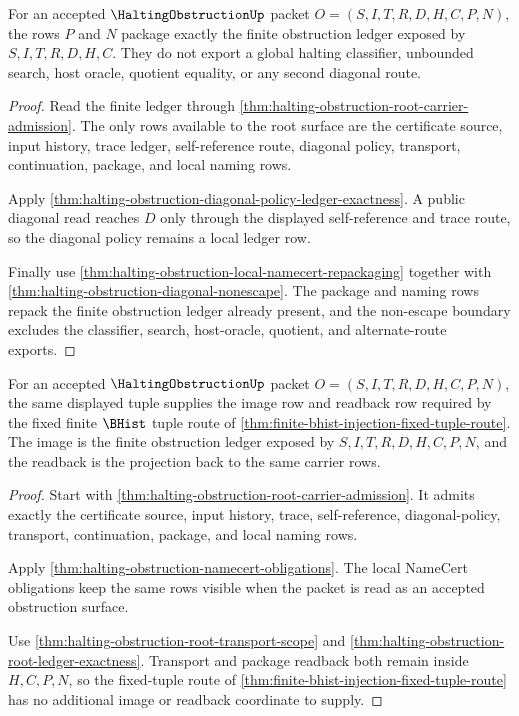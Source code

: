 \begin{theorem}
\label{thm:halting-obstruction-root-ledger-exactness}
For an accepted $\HaltingObstructionUp$ packet $O=(S,I,T,R,D,H,C,P,N)$, the
rows $P$ and $N$ package exactly the finite obstruction ledger exposed by
$S,I,T,R,D,H,C$. They do not export a global halting classifier, unbounded
search, host oracle, quotient equality, or any second diagonal route.
\end{theorem}
\begin{proof}
Read the finite ledger through
\autoref{thm:halting-obstruction-root-carrier-admission}. The only rows
available to the root surface are the certificate source, input history, trace
ledger, self-reference route, diagonal policy, transport, continuation,
package, and local naming rows.

Apply \autoref{thm:halting-obstruction-diagonal-policy-ledger-exactness}. A
public diagonal read reaches $D$ only through the displayed self-reference and
trace route, so the diagonal policy remains a local ledger row.

Finally use \autoref{thm:halting-obstruction-local-namecert-repackaging}
together with \autoref{thm:halting-obstruction-diagonal-nonescape}. The
package and naming rows repack the finite obstruction ledger already present,
and the non-escape boundary excludes the classifier, search, host-oracle,
quotient, and alternate-route exports.
\end{proof}

\begin{theorem}
\label{thm:halting-obstruction-stdbridge-image-readback}
For an accepted $\HaltingObstructionUp$ packet $O=(S,I,T,R,D,H,C,P,N)$, the
same displayed tuple supplies the image row and readback row required by the
fixed finite $\BHist$ tuple route of
\autoref{thm:finite-bhist-injection-fixed-tuple-route}. The image is the
finite obstruction ledger exposed by $S,I,T,R,D,H,C,P,N$, and the readback is
the projection back to the same carrier rows.
\end{theorem}
\begin{proof}
Start with \autoref{thm:halting-obstruction-root-carrier-admission}. It admits
exactly the certificate source, input history, trace, self-reference,
diagonal-policy, transport, continuation, package, and local naming rows.

Apply \autoref{thm:halting-obstruction-namecert-obligations}. The local
NameCert obligations keep the same rows visible when the packet is read as an
accepted obstruction surface.

Use \autoref{thm:halting-obstruction-root-transport-scope} and
\autoref{thm:halting-obstruction-root-ledger-exactness}. Transport and package
readback both remain inside $H,C,P,N$, so the fixed-tuple route of
\autoref{thm:finite-bhist-injection-fixed-tuple-route} has no additional image
or readback coordinate to supply.
\end{proof}

